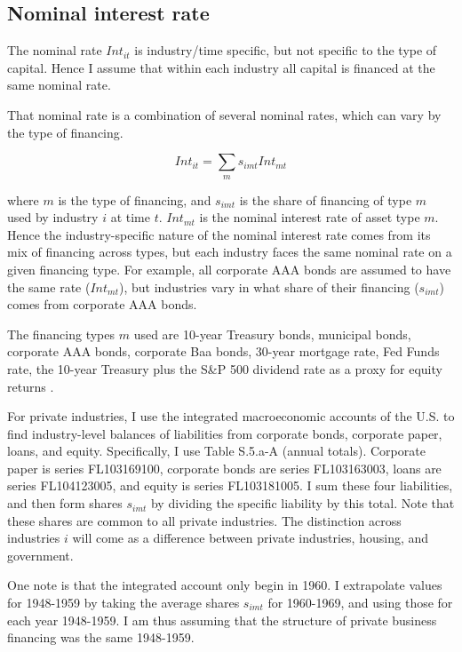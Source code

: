 \documentclass[11pt]{article}
\begin{document}
\subsection{Nominal interest rate}
The nominal rate $Int_{it}$ is industry/time specific, but not specific to the type of capital. Hence I assume that within each industry all capital is financed at the same nominal rate.

That nominal rate is a combination of several nominal rates, which can vary by the type of financing. 

\begin{equation}
    Int_{it} = \sum_m s_{imt} Int_{mt}
\end{equation} 

where $m$ is the type of financing, and $s_{imt}$ is the share of financing of type $m$ used by industry $i$ at time $t$. $Int_{mt}$ is the nominal interest rate of asset type $m$. Hence the industry-specific nature of the nominal interest rate comes from its mix of financing across types, but each industry faces the same nominal rate on a given financing type. For example, all corporate AAA bonds are assumed to have the same rate ($Int_{mt}$), but industries vary in what share of their financing ($s_{imt}$) comes from corporate AAA bonds. 

The financing types $m$ used are 10-year Treasury bonds, municipal bonds, corporate AAA bonds, corporate Baa bonds, 30-year mortgage rate, Fed Funds rate, the 10-year Treasury plus the S\&P 500 dividend rate as a proxy for equity returns \citep{fedint,fredmort,moodys,shiller}.

For private industries, I use the integrated macroeconomic accounts of the U.S. \citep{beaimap} to find industry-level balances of liabilities from corporate bonds, corporate paper, loans, and equity. Specifically, I use Table S.5.a-A (annual totals). Corporate paper is series FL103169100, corporate bonds are series FL103163003, loans are series FL104123005, and equity is series FL103181005. I sum these four liabilities, and then form shares $s_{imt}$ by dividing the specific liability by this total. Note that these shares are common to all private industries. The distinction across industries $i$ will come as a difference between private industries, housing, and government. 

One note is that the integrated account only begin in 1960. I extrapolate values for 1948-1959 by taking the average shares $s_{imt}$ for 1960-1969, and using those for each year 1948-1959. I am thus assuming that the structure of private business financing was the same 1948-1959. 
\end{document}
